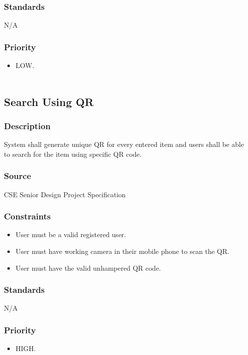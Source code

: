 \subsubsection{Standards}
N/A
\subsubsection{Priority}
\begin{itemize}
\item LOW.\\ \\
\end{itemize}

\subsection{Search Using QR}
\subsubsection{Description}
System shall generate unique QR for every entered item and users shall be able to search for the item using specific QR code.
\subsubsection{Source}
CSE Senior Design Project Specification
\subsubsection{Constraints}
\begin{itemize}
\item User must be a valid registered user.
\item User must have working camera in their mobile phone to scan the QR.
\item User must have the valid unhampered QR code. 
\end{itemize}
\subsubsection{Standards}
N/A
\subsubsection{Priority}
\begin{itemize}
\item HIGH.\\ \\
\end{itemize}

